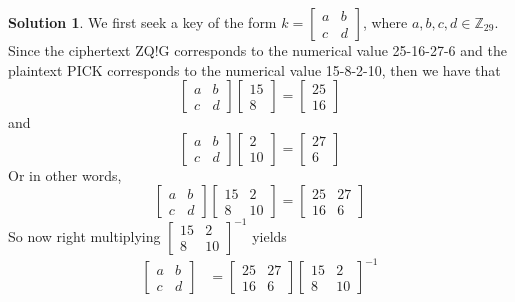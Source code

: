\documentclass[11pt]{article}
\theoremstyle{definition}\newtheorem{definition}{Definition}
\theoremstyle{definition}\newtheorem{question}{Question}
\theoremstyle{definition}\newtheorem*{solution}{Solution}
\theoremstyle{definition}\newtheorem{example}{Example}
\theoremstyle{definition}\newtheorem{notation}{Notation}
\theoremstyle{theorem}\newtheorem{theorem}{Theorem}
\theoremstyle{theorem}\newtheorem{corollary}{Corollary}
\theoremstyle{theorem}\newtheorem{lemma}{Lemma}
\theoremstyle{theorem}\newtheorem{proposition}{Proposition}
\newcommand{\Z}{\mathbb{Z}}
\begin{document}
\begin{solution}
    We first seek a key of the form $k = \begin{bmatrix} a & b \\ c & d \end{bmatrix}$, where $a, b, c, d \in \Z_{29}$. Since the ciphertext ZQ!G corresponds to the numerical value 25-16-27-6 and the plaintext PICK corresponds to the numerical value 15-8-2-10, then we have that
    \begin{equation*}
        \begin{bmatrix} a & b \\ c & d \end{bmatrix} \begin{bmatrix} 15 \\ 8 \end{bmatrix} = \begin{bmatrix} 25 \\ 16 \end{bmatrix}
    \end{equation*}
    and
    \begin{equation*}
        \begin{bmatrix} a & b \\ c & d \end{bmatrix} \begin{bmatrix} 2 \\ 10 \end{bmatrix} = \begin{bmatrix} 27 \\ 6 \end{bmatrix}
    \end{equation*}
    Or in other words,
    \begin{equation*}
        \begin{bmatrix} a & b \\ c & d \end{bmatrix} \begin{bmatrix} 15 & 2 \\ 8 & 10 \end{bmatrix} = \begin{bmatrix} 25 & 27 \\ 16 & 6 \end{bmatrix}
    \end{equation*}
    So now right multiplying $\begin{bmatrix} 15 & 2 \\ 8 & 10 \end{bmatrix}^{-1}$ yields
    \begin{align*}
        \begin{bmatrix} a & b \\ c & d \end{bmatrix} &= \begin{bmatrix} 25 & 27 \\ 16 & 6 \end{bmatrix} \begin{bmatrix} 15 & 2 \\ 8 & 10 \end{bmatrix}^{-1} \\

\end{align*}
\end{solution}
\end{document}
